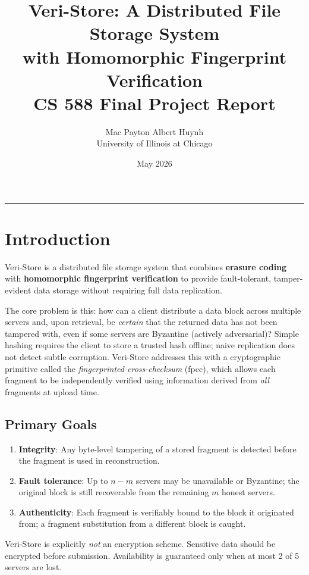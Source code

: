 \documentclass[10pt]{article}
\title{\textbf{Veri-Store: A Distributed File Storage System\\
               with Homomorphic Fingerprint Verification}\\[0.4em]
       \large CS 588 Final Project Report}
\author{Mac Payton \quad Albert Huynh\\
        University of Illinois at Chicago}
\date{May 2026}
\begin{document}
\maketitle
\vspace{-1em}
\hrule
\vspace{0.6em}

\section{Introduction}

Veri-Store is a distributed file storage system that combines \textbf{erasure coding} with
\textbf{homomorphic fingerprint verification} to provide fault-tolerant, tamper-evident
data storage without requiring full data replication.

The core problem is this: how can a client distribute a data block across multiple servers
and, upon retrieval, be \emph{certain} that the returned data has not been tampered with,
even if some servers are Byzantine (actively adversarial)? Simple hashing requires the
client to store a trusted hash offline; naive replication does not detect subtle corruption.
Veri-Store addresses this with a cryptographic primitive called the
\emph{fingerprinted cross-checksum} (fpcc), which allows each fragment to be independently
verified using information derived from \emph{all} fragments at upload time.

\subsection*{Primary Goals}
\begin{enumerate}
  \item \textbf{Integrity}: Any byte-level tampering of a stored fragment is detected
        before the fragment is used in reconstruction.
  \item \textbf{Fault tolerance}: Up to $n - m$ servers may be unavailable or Byzantine;
        the original block is still recoverable from the remaining $m$ honest servers.
  \item \textbf{Authenticity}: Each fragment is verifiably bound to the block it originated
        from; a fragment substitution from a different block is caught.
\end{enumerate}

Veri-Store is explicitly \emph{not} an encryption scheme. Sensitive data should be
encrypted before submission. Availability is guaranteed only when at most 2 of 5 servers
are lost.
\end{document}
